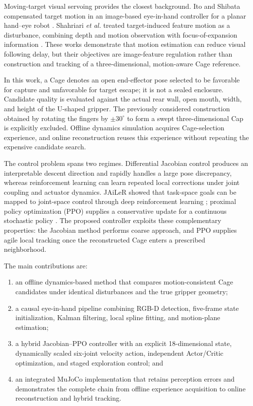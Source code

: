 \documentclass[conference]{IEEEtran}
\begin{document}
Moving-target visual servoing provides the closest background. Ito and Shibata compensated target motion in an image-based eye-in-hand controller for a planar hand--eye robot \cite{ito2009}. Shahriari \emph{et al.} treated target-induced feature motion as a disturbance, combining depth and motion observation with focus-of-expansion information \cite{shahriari2013}. These works demonstrate that motion estimation can reduce visual following delay, but their objectives are image-feature regulation rather than construction and tracking of a three-dimensional, motion-aware Cage reference.

In this work, a Cage denotes an open end-effector pose selected to be favorable for capture and unfavorable for target escape; it is not a sealed enclosure. Candidate quality is evaluated against the actual rear wall, open mouth, width, and height of the U-shaped gripper. The previously considered construction obtained by rotating the fingers by $\pm30^{\circ}$ to form a swept three-dimensional Cap is explicitly excluded. Offline dynamics simulation acquires Cage-selection experience, and online reconstruction reuses this experience without repeating the expensive candidate search.

The control problem spans two regimes. Differential Jacobian control produces an interpretable descent direction and rapidly handles a large pose discrepancy, whereas reinforcement learning can learn repeated local corrections under joint coupling and actuator dynamics. JAiLeR showed that task-space goals can be mapped to joint-space control through deep reinforcement learning \cite{kumar2021}; proximal policy optimization (PPO) supplies a conservative update for a continuous stochastic policy \cite{schulman2017ppo}. The proposed controller exploits these complementary properties: the Jacobian method performs coarse approach, and PPO supplies agile local tracking once the reconstructed Cage enters a prescribed neighborhood.

The main contributions are:
\begin{enumerate}
    \item an offline dynamics-based method that compares motion-consistent Cage candidates under identical disturbances and the true gripper geometry;
    \item a causal eye-in-hand pipeline combining RGB-D detection, five-frame state initialization, Kalman filtering, local spline fitting, and motion-plane estimation;
    \item a hybrid Jacobian--PPO controller with an explicit 18-dimensional state, dynamically scaled six-joint velocity action, independent Actor/Critic optimization, and staged exploration control; and
    \item an integrated MuJoCo implementation that retains perception errors and demonstrates the complete chain from offline experience acquisition to online reconstruction and hybrid tracking.
\end{enumerate}
\end{document}
